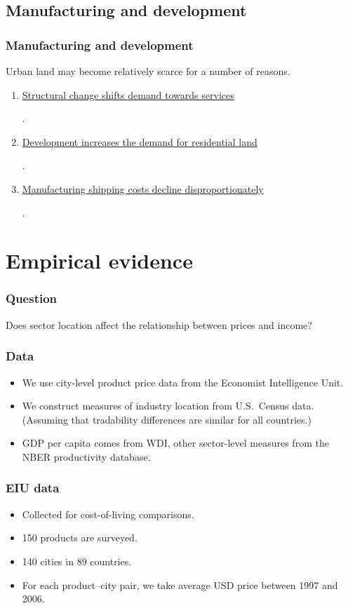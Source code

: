 \documentclass[compress,mathserif]{beamer}
\newcounter{perc}
\newcounter{percek}
\newcommand{\jumpto}[2]{\hypertarget{#1back}{\hyperlink{#1}{#2}}}
\renewcommand{\time}[1]{\addtocounter{percek}{#1}}
\begin{document}
\subsection{Manufacturing and development}

\begin{frame}\frametitle{Manufacturing and development}
Urban land may become relatively scarce for a number of reasons.
\begin{enumerate}
\item \jumpto{PPF-location-nonhomothetic-1}{Structural change shifts demand towards services}.
\item \jumpto{PPF-location-housing-1}{Development increases the demand for residential land}.
\item \jumpto{PPF-location-transport-1}{Manufacturing shipping costs decline disproportionately}.
\end{enumerate}
\end{frame}
\time 1


\section{Empirical evidence}

\begin{frame}\frametitle{Question}
Does sector location affect the relationship between prices and income?
\end{frame}

\begin{frame}\frametitle{Data}
\begin{itemize}
\item We use city-level product price data from the Economist Intelligence Unit.
\item We construct measures of industry location from U.S.~Census data.
(Assuming that tradability differences are similar for all countries.)
\item GDP per capita comes from WDI, other sector-level measures from the NBER productivity database.
\end{itemize}
\end{frame}

\begin{frame}\frametitle{EIU data}
\begin{itemize}
\item Collected for cost-of-living comparisons.
\item 150 products are surveyed.
\item 140 cities in 89 countries.
\item For each product--city pair, we take average USD price between 1997 and 2006.
\end{itemize}
\end{frame}
\time 4
\end{document}
